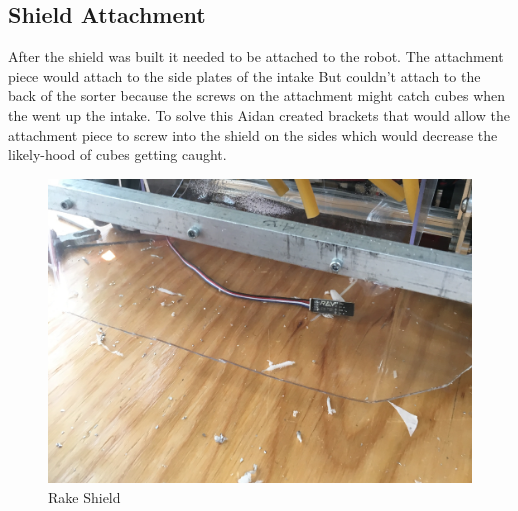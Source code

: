 \documentclass{article}
\begin{document}
\subsection{Shield Attachment}
After the shield was built it needed to be attached to the robot. The attachment piece would attach to the side plates of the intake But couldn't attach to the back of the sorter because the screws on the attachment might catch cubes when the went up the intake. To solve this Aidan created brackets that would allow the attachment piece to screw into the shield on the sides which would decrease the likely-hood of cubes getting caught.

\begin{figure}
    \centering
    \includegraphics[width=.6 \textwidth]{11_11-12/images/rake.jpg}
    \caption{Rake Shield}
    \label{fig:rakeshield}
\end{figure}
\end{document}
